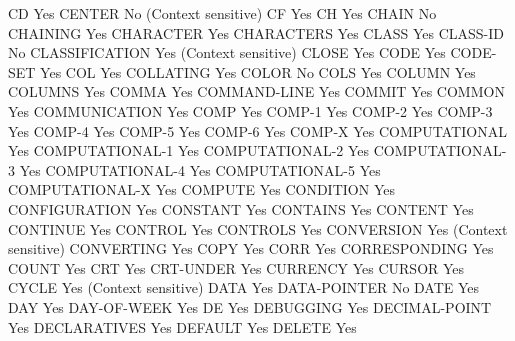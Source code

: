 CD                              Yes
CENTER                          No (Context sensitive)
CF                              Yes
CH                              Yes
CHAIN                           No
CHAINING                        Yes
CHARACTER                       Yes
CHARACTERS                      Yes
CLASS                           Yes
CLASS-ID                        No
CLASSIFICATION                  Yes (Context sensitive)
CLOSE                           Yes
CODE                            Yes
CODE-SET                        Yes
COL                             Yes
COLLATING                       Yes
COLOR                           No
COLS                            Yes
COLUMN                          Yes
COLUMNS                         Yes
COMMA                           Yes
COMMAND-LINE                    Yes
COMMIT                          Yes
COMMON                          Yes
COMMUNICATION                   Yes
COMP                            Yes
COMP-1                          Yes
COMP-2                          Yes
COMP-3                          Yes
COMP-4                          Yes
COMP-5                          Yes
COMP-6                          Yes
COMP-X                          Yes
COMPUTATIONAL                   Yes
COMPUTATIONAL-1                 Yes
COMPUTATIONAL-2                 Yes
COMPUTATIONAL-3                 Yes
COMPUTATIONAL-4                 Yes
COMPUTATIONAL-5                 Yes
COMPUTATIONAL-X                 Yes
COMPUTE                         Yes
CONDITION                       Yes
CONFIGURATION                   Yes
CONSTANT                        Yes
CONTAINS                        Yes
CONTENT                         Yes
CONTINUE                        Yes
CONTROL                         Yes
CONTROLS                        Yes
CONVERSION                      Yes (Context sensitive)
CONVERTING                      Yes
COPY                            Yes
CORR                            Yes
CORRESPONDING                   Yes
COUNT                           Yes
CRT                             Yes
CRT-UNDER                       Yes
CURRENCY                        Yes
CURSOR                          Yes
CYCLE                           Yes (Context sensitive)
DATA                            Yes
DATA-POINTER                    No
DATE                            Yes
DAY                             Yes
DAY-OF-WEEK                     Yes
DE                              Yes
DEBUGGING                       Yes
DECIMAL-POINT                   Yes
DECLARATIVES                    Yes
DEFAULT                         Yes
DELETE                          Yes
